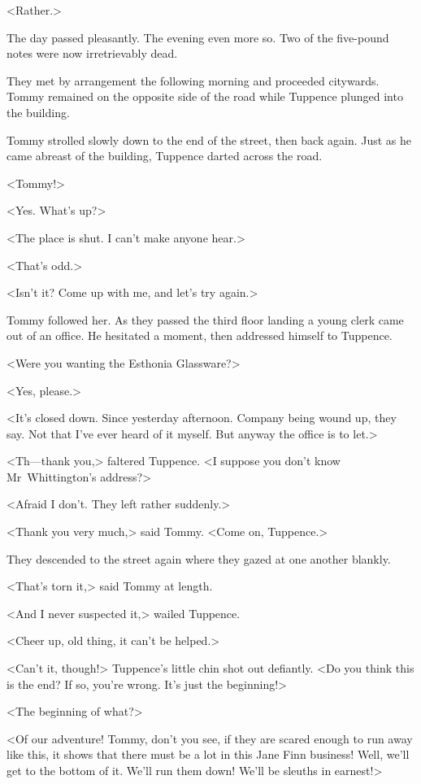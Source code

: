 <Rather.>

The day passed pleasantly. The evening even more so. Two of the five-pound notes were now irretrievably dead.

They met by arrangement the following morning and proceeded citywards. Tommy remained on the opposite side of the road while Tuppence plunged into the building.

Tommy strolled slowly down to the end of the street, then back again. Just as he came abreast of the building, Tuppence darted across the road.

<Tommy!>

<Yes. What's up?>

<The place is shut. I can't make anyone hear.>

<That's odd.>

<Isn't it? Come up with me, and let's try again.>

Tommy followed her. As they passed the third floor landing a young clerk came out of an office. He hesitated a moment, then addressed himself to Tuppence.

<Were you wanting the Esthonia Glassware?>

<Yes, please.>

<It's closed down. Since yesterday afternoon. Company being wound up, they say. Not that I've ever heard of it myself. But anyway the office is to let.>

<Th—thank you,> faltered Tuppence. <I suppose you don't know Mr~Whittington's address?>

<Afraid I don't. They left rather suddenly.>

<Thank you very much,> said Tommy. <Come on, Tuppence.>

They descended to the street again where they gazed at one another blankly.

<That's torn it,> said Tommy at length.

<And I never suspected it,> wailed Tuppence.

<Cheer up, old thing, it can't be helped.>

<Can't it, though!> Tuppence's little chin shot out defiantly. <Do you think this is the end? If so, you're wrong. It's just the beginning!>

<The beginning of what?>

<Of our adventure! Tommy, don't you see, if they are scared enough to run away like this, it shows that there must be a lot in this Jane Finn business! Well, we'll get to the bottom of it. We'll run them down! We'll be sleuths in earnest!>

